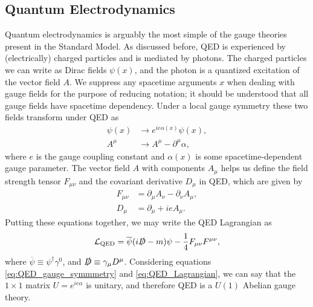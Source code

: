 \subsection{Quantum Electrodynamics}\label{sec:QED}
Quantum electrodynamics is arguably the most simple of the gauge theories present in the Standard Model.  As discussed before, QED is experienced by (electrically) charged particles and is mediated by photons.  The charged particles we can write as Dirac fields $\psi(x)$, and the photon is a quantized excitation of the vector field $A$. We suppress any spacetime arguments $x$ when dealing with gauge fields for the purpose of reducing notation; it should be understood that all gauge fields have spacetime dependency.  Under a local gauge symmetry these two fields transform under QED as
\begin{equation}\label{eq:QED_gauge_symmmetry}
    \begin{split}
        \psi(x) &\rightarrow e^{ie\alpha(x)}\psi(x),\\
        A^\mu &\rightarrow  A^\mu - \partial^\mu \alpha,
    \end{split}
\end{equation}
where $e$ is the gauge coupling constant and $\alpha(x)$ is some spacetime-dependent gauge parameter.  The vector field $A$ with components $A_\mu$ helps us define the field strength tensor $F_{\mu\nu}$ and the covariant derivative $D_\mu$ in QED, which are given by
\begin{equation}
\begin{split}
    F_{\mu\nu} &= \partial_\mu A_\nu -  \partial_\nu A_\mu,\\
    D_\mu &= \partial_\mu + ieA_\mu.
\end{split}
\end{equation}
Putting these equations together, we may write the QED Lagrangian as
\begin{equation}\label{eq:QED_Lagrangian}
    \mathcal{L}_{\mathrm{QED}} = \overline{\psi}(i\slashed{D}-m)\psi-\frac{1}{4}F_{\mu\nu}F^{\mu\nu},
\end{equation}
where $\overline{\psi} \equiv \psi^\dagger\gamma^0$, and $\slashed{D}\equiv\gamma_\mu D^\mu$.  Considering equations \ref{eq:QED_gauge_symmmetry} and \ref{eq:QED_Lagrangian}, we can say that the $1\times1$ matrix $U=e^{ie\alpha}$ is unitary, and therefore QED is a $U(1)$ Abelian gauge theory.  

